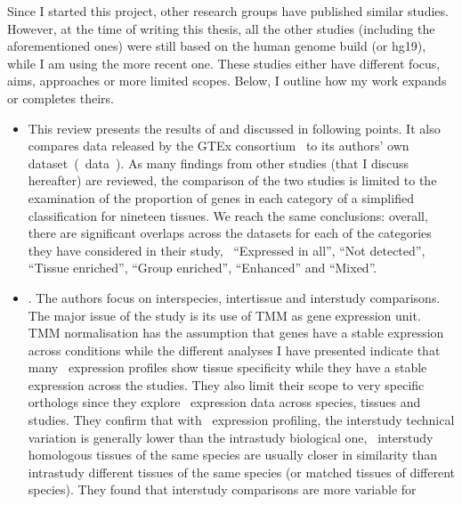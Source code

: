 Since I started this project,
other research groups have published similar studies.
However, at the time of writing this thesis,
all the other studies (including the aforementioned ones)
were still based on the human genome build  (or hg19),
while I am using the more recent  one.
These studies either have different focus, aims,
approaches or more limited scopes.
Below, I outline how my work expands or completes theirs.
\begin{itemize}[topsep=0pt,nosep]
\item\hspace{-1mm} This review
presents the results of \citet{Yu2015-uh} and \citet{Danielsson2015-cn}
discussed in following points.
It also compares data released by the \gls{GTEx} consortium~
to its authors' own dataset~(\uhlen\ data~).
As many findings from other studies (that I discuss hereafter) are reviewed,
the comparison of the two studies is
limited to the examination of
the proportion of genes in each category of a simplified classification
for nineteen tissues.
We reach the same conclusions:
overall, there are significant overlaps across the datasets for each of the
categories they have considered in their study, \ie\ \enquote{Expressed in all},
\enquote{Not detected}, \enquote{Tissue enriched}, \enquote{Group enriched},
\enquote{Enhanced} and \enquote{Mixed}.
\item\hspace{-1mm}.
The authors focus on interspecies, intertissue and interstudy comparisons.
The major issue of the study is its use of \gls{TMM} as gene expression unit.
\gls{TMM} normalisation has the assumption that
genes have a stable expression across conditions while the different analyses
I have presented indicate that many \pcgs\ expression profiles show tissue
specificity while they have a stable expression across the studies.
They also limit their scope to very specific orthologs
since they explore \Rnaseq\ expression data across species, tissues and studies.
They confirm that with \Rnaseq\ expression profiling,
the interstudy technical variation is generally lower than
the intrastudy biological one, \ie\
interstudy homologous tissues of the same species are usually
closer in similarity than intrastudy different tissues of the same species
(or matched tissues of different species).
They found that interstudy comparisons are more variable for 

\end{itemize}
